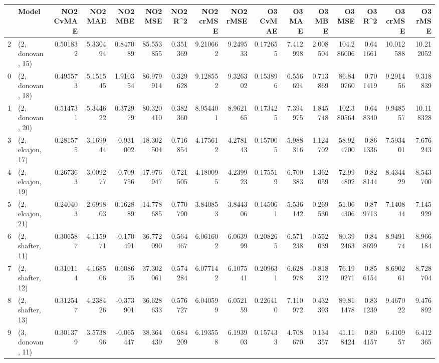 \begin{tabular}{llrrrrrrrrrrrrrr}
\toprule
{} &             Model &  NO2 CvMAE &   NO2 MAE &   NO2 MBE &    NO2 MSE &   NO2 R\textasciicircum2 &  NO2 crMSE &  NO2 rMSE &  O3 CvMAE &    O3 MAE &    O3 MBE &      O3 MSE &    O3 R\textasciicircum2 &   O3 crMSE &    O3 rMSE \\
\midrule
2  &  (2, donovan, 15) &   0.501832 &  5.330494 &  0.847089 &  85.553855 &  0.351369 &   9.210662 &  9.249533 &  0.172655 &  7.412998 &  2.008504 &  104.286006 &  0.641661 &  10.012588 &  10.212052 \\
0  &  (2, donovan, 18) &   0.495573 &  5.151545 &  1.910354 &  86.979914 &  0.329628 &   9.128552 &  9.326302 &  0.153896 &  6.556694 &  0.713869 &   86.840760 &  0.701419 &   9.291456 &   9.318839 \\
1  &  (2, donovan, 20) &   0.514731 &  5.344622 &  0.372979 &  80.320410 &  0.382360 &   8.954401 &  8.962165 &  0.173425 &  7.394975 &  1.845748 &  102.380564 &  0.648340 &   9.948557 &  10.118328 \\
3  &  (2, elcajon, 17) &   0.281575 &  3.169944 & -0.931002 &  18.302504 &  0.716854 &   4.175612 &  4.278143 &  0.157005 &  5.988316 &  1.124702 &   58.924700 &  0.861336 &   7.593401 &   7.676243 \\
4  &  (2, elcajon, 19) &   0.267363 &  3.009277 & -0.709756 &  17.976947 &  0.721505 &   4.180095 &  4.239923 &  0.175519 &  6.700383 &  1.362059 &   72.994802 &  0.828144 &   8.434429 &   8.543700 \\
5  &  (2, elcajon, 21) &   0.240403 &  2.699803 &  0.162889 &  14.778685 &  0.770790 &   3.840853 &  3.844306 &  0.145061 &  5.536142 &  0.269530 &   51.064306 &  0.879713 &   7.140844 &   7.145929 \\
6  &  (2, shafter, 11) &   0.306587 &  4.115971 & -0.170491 &  36.772090 &  0.564467 &   6.061602 &  6.063999 &  0.208265 &  6.571238 & -0.552039 &   80.392463 &  0.848699 &   8.949174 &   8.966184 \\
7  &  (2, shafter, 12) &   0.310114 &  4.168506 &  0.608615 &  37.302061 &  0.574284 &   6.077142 &  6.107541 &  0.209631 &  6.628978 & -0.818312 &   76.190271 &  0.856154 &   8.690261 &   8.728704 \\
8  &  (2, shafter, 13) &   0.312547 &  4.238426 & -0.373901 &  36.628633 &  0.576727 &   6.040599 &  6.052159 &  0.226410 &  7.110972 &  0.432393 &   89.811478 &  0.831239 &   9.467022 &   9.476892 \\
9  &  (3, donovan, 11) &   0.301379 &  3.573896 & -0.065447 &  38.364439 &  0.684209 &   6.193558 &  6.193903 &  0.157433 &  4.708670 &  0.134357 &   41.118424 &  0.804157 &   6.410957 &   6.412365 \\

\end{tabular}
